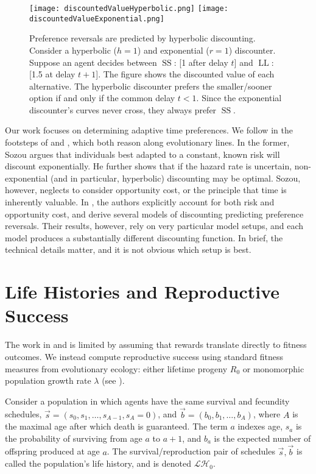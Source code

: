 \documentclass[titlepage, hidelinks, 12pt]{article}
\theoremstyle{plain}
\theoremstyle{remark}
\theoremstyle{definition}
\newcommand{\LH}{\mathcal{LH}}
\DeclareMathOperator{\smallersooner}{SS}
\DeclareMathOperator{\largerlater}{LL}
\begin{document}
\begin{figure}[H]
    \centering
    \texttt{[image: discountedValueHyperbolic.png]}
    \texttt{[image: discountedValueExponential.png]}
    \caption{Preference reversals are predicted by hyperbolic discounting. Consider a hyperbolic ($h = 1$) and exponential ($r = 1$) discounter. 
       Suppose an agent
    decides between $\smallersooner$: [1 after delay $t$] and $\largerlater$: [1.5 at delay $t+1$]. The figure shows the discounted value
    of each alternative. The hyperbolic discounter prefers the smaller/sooner option if and only if the common delay $t < 1$. 
    Since the exponential discounter's curves never cross, they always prefer $\smallersooner$. }
\end{figure}

Our work focuses on determining adaptive time preferences. 
We follow in the footsteps of \cite{sozou98} and \cite{fawcett12}, which both reason along evolutionary lines. 
In the former, Sozou argues that individuals best adapted
to a constant, known risk will discount exponentially. He further shows that if the hazard rate is uncertain, non-exponential (and in particular,
hyperbolic) discounting may
be optimal. Sozou, however, neglects to consider opportunity cost, or the principle that time is inherently valuable. 
In \cite{fawcett12}, the authors explicitly account for both risk and opportunity cost, and derive several models of discounting predicting 
preference reversals. Their results, however, rely on very particular model setups, and each model produces a substantially different discounting
function. In brief, the technical details matter, and it is not obvious which setup is best.




\section{Life Histories and Reproductive Success}

The work in \cite{sozou98} and \cite{fawcett12} is limited by assuming that rewards translate directly to fitness outcomes. We instead
compute reproductive success
using standard fitness measures from evolutionary ecology: either lifetime progeny $R_0$ or monomorphic population growth rate $\lambda$ 
(see \cite{stearns92}).

Consider a population in which agents have the same survival and fecundity
schedules, $\vec{s} = (s_0, s_1, \ldots, s_{A-1}, s_A = 0)$, and $\vec{b} = (b_0, b_1, \ldots, b_A)$, where $A$ is the maximal age after
which death is guaranteed. The term $a$ indexes age, $s_a$ is the probability of surviving from age $a$ to $a+1$, and $b_a$ is the expected
number of offspring produced at age $a$. 
The survival/reproduction pair of schedules $\vec{s}, \vec{b}$
is called the population's life history, and is denoted $\LH_0$. 
\end{document}
